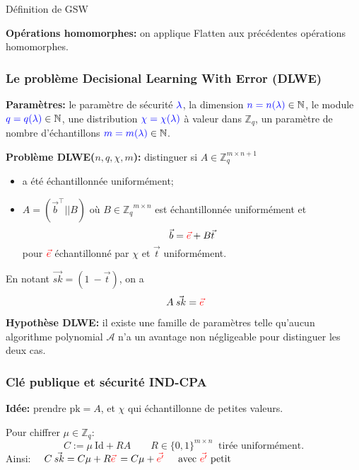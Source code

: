 \documentclass[10pt,xcolor={usenames,dvipsnames}]{beamer}
\newcommand{\ZZq}{\mathbb{Z}_q}
\begin{document}
\begin{section}{Définition de GSW}
\begin{frame}
\textbf{Opérations homomorphes:} on applique Flatten aux précédentes opérations homomorphes.

\end{frame} 
  
  
\begin{frame} 
\frametitle{Le problème Decisional Learning With Error (DLWE)}
\textbf{Paramètres:} le paramètre de sécurité $\color{blue}\lambda$,
la dimension ${\color{blue}n = n(\lambda)} \in \mathbb{N}$,
le module ${\color{blue}q = q(\lambda)} \in \mathbb{N}$,
une distribution ${\color{blue}\chi = \chi(\lambda)}$ à valeur dans $\ZZq$,
un paramètre de nombre d'échantillons ${\color{blue}m = m(\lambda)}\in \mathbb{N}$.

\textbf{Problème DLWE($n, q, \chi, m$):} 
distinguer si $A \in \ZZq^{m \times n+1}$ 
\begin{itemize}
\item a été échantillonnée uniformément; 
\item $A = (\vec{b}^\intercal ||B)$ où $B\in {\ZZq}^{m \times n}$
est échantillonnée uniformément et 
\[\vec{b} = {\color{red}\vec{e}} + B \vec{t}\]
pour  $\color{red}\vec{e}$ échantillonné par $\chi$ et $\vec{t}$ uniformément.
\end{itemize}

En notant $\vec{sk} = (1\: -\vec{t})$, on a
\[ A \:\vec{sk} = {\color{red}\vec{e}} \]


\textbf{Hypothèse DLWE:} il existe une famille de paramètres telle qu'aucun algorithme polynomial
$\mathcal{A}$ n'a un avantage non négligeable pour distinguer les deux cas.
\end{frame} 



\begin{frame} 
\frametitle{Clé publique et sécurité IND-CPA}
\textbf{Idée:} prendre $\text{pk}= A$, et $\chi$ qui échantillonne de petites valeurs.

Pour chiffrer $\mu \in \ZZq$:
\[ C :=\mu\:\text{Id} + RA \qquad R\in {\{0,1\}}^{m \times n}\: \text{ tirée uniformément.} \]
Ainsi: $\quad C\:\vec{sk} = C \mu +  R {\color{red}\vec{e}}\:= C \mu + {\color{red}\vec{e'}}
\quad\:\: \text{avec } {\color{red}\vec{e'}} \text{ petit}$



\end{frame}
\end{section}
\end{document}
